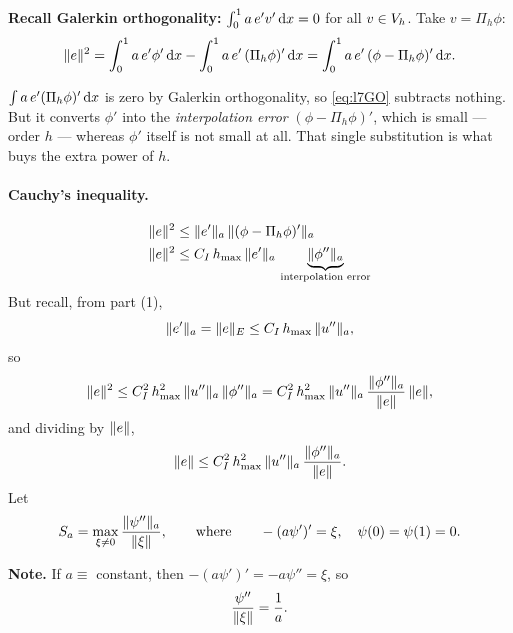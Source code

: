 \medskip\noindent
\textbf{Recall Galerkin orthogonality:}
$\int_0^1 a\,e'v'\,\mathrm{d} x=0$ for all $v\in V_{h}$. Take $v=\Pi_h\phi$:
\begin{equation}\label{eq:l7GO}
  \lVert e\rVert^{2}
   = \int_0^1 a\,e'\phi'\,\mathrm{d} x-\int_0^1 a\,e'\,(\Pi_h\phi)'\,\mathrm{d} x
   = \int_0^1 a\,e'\,(\phi-\Pi_h\phi)'\,\mathrm{d} x .
\end{equation}

\begin{intuition}
$\int a\,e'(\Pi_h\phi)'\,\mathrm{d} x$ is zero by Galerkin orthogonality, so
\eqref{eq:l7GO} subtracts nothing. But it converts $\phi'$ into the
\emph{interpolation error} $(\phi-\Pi_h\phi)'$, which is small --- order $h$ ---
whereas $\phi'$ itself is not small at all. That single substitution is what
buys the extra power of $h$.
\end{intuition}

\paragraph{Cauchy's inequality.}
\begin{align}
  \lVert e\rVert^{2} &\le \lVert e'\rVert_{a}\,\lVert(\phi-\Pi_h\phi)'\rVert_{a}
   \label{eq:l7cauchy}\\
  \lVert e\rVert^{2} &\le C_{I}\,h_{\max}\,\lVert e'\rVert_{a}\,
                    \underbrace{\lVert\phi''\rVert_{a}}_{\text{interpolation error}}
   \label{eq:l7cauchy2}
\end{align}
But recall, from part (1),
\begin{equation}\label{eq:l7recall}
  \lVert e'\rVert_{a}=\lVert e\rVert_{E}\le C_{I}\,h_{\max}\,\lVert u''\rVert_{a},
\end{equation}
so
\begin{equation}\label{eq:l7chain}
  \lVert e\rVert^{2}\le C_{I}^{2}\,h_{\max}^{2}\,\lVert u''\rVert_{a}\,\lVert\phi''\rVert_{a}
  = C_{I}^{2}\,h_{\max}^{2}\,\lVert u''\rVert_{a}\,
    \frac{\lVert\phi''\rVert_{a}}{\lVert e\rVert}\,\lVert e\rVert,
\end{equation}
and dividing by $\lVert e\rVert$,
\begin{equation}\label{eq:l7L2}
  \lVert e\rVert\le C_{I}^{2}\,h_{\max}^{2}\,\lVert u''\rVert_{a}\,
              \frac{\lVert\phi''\rVert_{a}}{\lVert e\rVert} .
\end{equation}
Let
\begin{equation}\label{eq:l7Sa}
  S_{a}=\max_{\xi\neq0}\frac{\lVert\psi''\rVert_{a}}{\lVert\xi\rVert},
  \qquad\text{where}\qquad
  -(a\psi')'=\xi,\quad \psi(0)=\psi(1)=0 .
\end{equation}

\medskip\noindent\textbf{Note.} If $a\equiv$ constant, then
$-(a\psi')'=-a\psi''=\xi$, so
\begin{equation}\label{eq:l7const}
  \frac{\psi''}{\lVert\xi\rVert}=\frac{1}{a}.
\end{equation}

